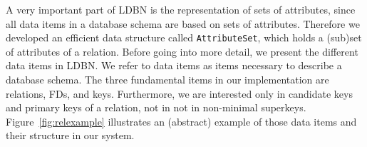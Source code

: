 A very important part of LDBN is the representation of sets of attributes, since all 
data items in a database schema are based on sets of attributes. Therefore we developed an
efficient data structure called \verb=AttributeSet=, which holds a (sub)set of attributes of a relation.  
Before going into more detail, we present the different data items in LDBN. 
We refer to data items as items necessary to describe a database schema.  
The three fundamental items in our implementation are relations, FDs, and keys. Furthermore,
we are interested only in candidate keys and primary keys of a relation, not in not in non-minimal superkeys.
Figure~\ref{fig:relexample} illustrates
an (abstract) example of those data items and their structure in our system. 


